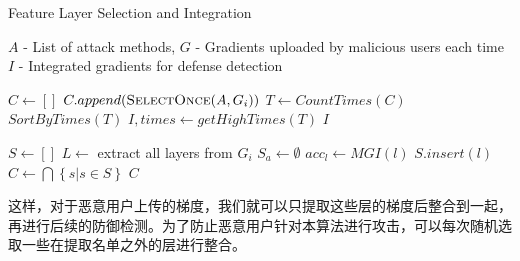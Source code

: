 \documentclass[conference]{IEEEtran}
\begin{document}
\begin{algorithm}
    \caption{Feature Layer Selection and Integration}
    \label{alg:featureLayerSelection}
    \begin{algorithmic}[1]
        \Require $A$ - List of attack methods, $G$ - Gradients uploaded by malicious users each time
        \Ensure $I$ - Integrated gradients for defense detection

            \State $C \gets \left [ \right ] $
                \State $C.append( \Call{SelectOnce}{A, G_i})$
            \EndFor
            \State $T \gets CountTimes(C)$
            \State $SortByTimes(T)$
            \State $I, times \gets getHighTimes(T)$
            \State \Return $I$
        \EndFunction

            \State $S \gets \left [  \right ] $
                \State $L \gets$ extract all layers from $G_i$
                \State $S_a \gets \emptyset$
                    \State $acc_l \gets MGI(l)$
                        \State $S.insert(l)$
                    \EndIf
                \EndFor
            \State $C \gets \bigcap\left \{ s | s\in S  \right \}$
            \EndFor
            \State \Return $C$
        \EndFunction


        


    \end{algorithmic}
\end{algorithm}

这样，对于恶意用户上传的梯度，我们就可以只提取这些层的梯度后整合到一起，再进行后续的防御检测。为了防止恶意用户针对本算法进行攻击，可以每次随机选取一些在提取名单之外的层进行整合。%



\end{document}
